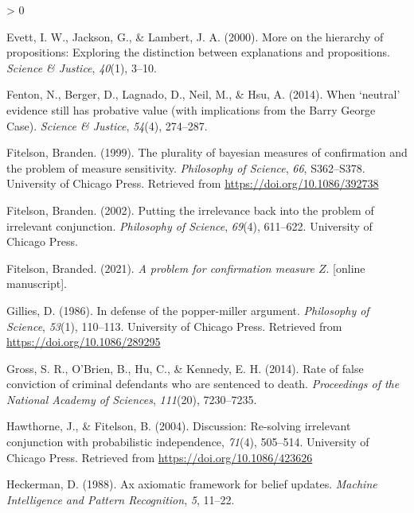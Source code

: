 \documentclass[
  10pt,
  dvipsnames,enabledeprecatedfontcommands]{scrartcl}
\newlength{\cslhangindent}
\newenvironment{CSLReferences}[2] %
 {%
  \setlength{\parindent}{0pt}
  \ifodd #1 \everypar{\setlength{\hangindent}{\cslhangindent}}\ignorespaces\fi
  \ifnum #2 > 0
  \setlength{\parskip}{#2\baselineskip}
  \fi
 }%
 {}
\begin{document}
\begin{CSLReferences}{1}{0}
\leavevmode\hypertarget{ref-evett2000MoreHierarchyPropositions}{}%
Evett, I. W., Jackson, G., \& Lambert, J. A. (2000). More on the
hierarchy of propositions: Exploring the distinction between
explanations and propositions. \emph{Science \& Justice}, \emph{40}(1),
3--10.

\leavevmode\hypertarget{ref-fenton2014WhenNeutralEvidence}{}%
Fenton, N., Berger, D., Lagnado, D., Neil, M., \& Hsu, A. (2014). When
{`neutral'} evidence still has probative value (with implications from
the {Barry George Case}). \emph{Science \& Justice}, \emph{54}(4),
274--287.

\leavevmode\hypertarget{ref-Fitelson1999plurality}{}%
Fitelson, Branden. (1999). The plurality of bayesian measures of
confirmation and the problem of measure sensitivity. \emph{Philosophy of
Science}, \emph{66}, S362--S378. University of Chicago Press. Retrieved
from \url{https://doi.org/10.1086/392738}

\leavevmode\hypertarget{ref-Fitelson2002irrelevance}{}%
Fitelson, Branden. (2002). Putting the irrelevance back into the problem
of irrelevant conjunction. \emph{Philosophy of Science}, \emph{69}(4),
611--622. University of Chicago Press.

\leavevmode\hypertarget{ref-Fitelson2021z_measure}{}%
Fitelson, Branded. (2021). \emph{A problem for confirmation measure
\(Z\)}. {[}online manuscript{]}.

\leavevmode\hypertarget{ref-Gillies1986defense}{}%
Gillies, D. (1986). In defense of the popper-miller argument.
\emph{Philosophy of Science}, \emph{53}(1), 110--113. University of
Chicago Press. Retrieved from \url{https://doi.org/10.1086/289295}

\leavevmode\hypertarget{ref-gross2014RateFalseConviction}{}%
Gross, S. R., O'Brien, B., Hu, C., \& Kennedy, E. H. (2014). Rate of
false conviction of criminal defendants who are sentenced to death.
\emph{Proceedings of the National Academy of Sciences}, \emph{111}(20),
7230--7235.

\leavevmode\hypertarget{ref-HawthorneFitelson2004re-solving}{}%
Hawthorne, J., \& Fitelson, B. (2004). Discussion: Re-solving irrelevant
conjunction with probabilistic independence, \emph{71}(4), 505--514.
University of Chicago Press. Retrieved from
\url{https://doi.org/10.1086/423626}

\leavevmode\hypertarget{ref-Heckerman1988axiomatic}{}%
Heckerman, D. (1988). Ax axiomatic framework for belief updates.
\emph{Machine Intelligence and Pattern Recognition}, \emph{5}, 11--22.


\end{CSLReferences}
\end{document}
